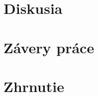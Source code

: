 \documentclass[12pt,a4paper]{article}
\begin{document}
\section{Diskusia}


\section{Závery práce}


\section{Zhrnutie}



\nocite{*}
\printbibliography
\thispagestyle{empty}

\end{document}
